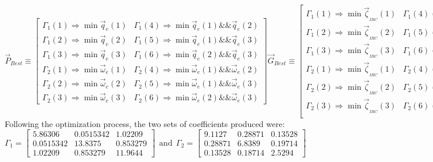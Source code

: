 \begin{subequations}
\begin{equation}
\vec{P}_{Best}\equiv
\begin{bmatrix}
\Gamma_1(1)\Rightarrow \min \vec{q}_e(1) & \Gamma_1(4)\Rightarrow \min \vec{q}_e(1)\&\&\vec{q}_e(2)\\
\Gamma_1(2)\Rightarrow \min \vec{q}_e(2)& \Gamma_1(5)\Rightarrow \min\vec{q}_e(1)\&\&\vec{q}_e(3) \\
\Gamma_1(3)\Rightarrow \min \vec{q}_e(3) & \Gamma_1(6)\Rightarrow \min\vec{q}_e(2)\&\&\vec{q}_e(3)\\
\Gamma_2(1)\Rightarrow \min \vec{\omega}_e(1) & \Gamma_2(4)\Rightarrow \min\vec{\omega}_e(1)\&\&\vec{\omega}_e(2)\\
\Gamma_2(2)\Rightarrow \min \vec{\omega}_e(2) & \Gamma_2(5)\Rightarrow\min\vec{\omega}_e(1)\&\&\vec{\omega}_e(3)\\
\Gamma_2(3)\Rightarrow \min \vec{\omega}_e(3)& \Gamma_2(6)\Rightarrow\min\vec{\omega}_e(2)\&\&\vec{\omega}_e(3)
\end{bmatrix}
\end{equation}
\begin{equation}
\vec{G}_{Best}\equiv\begin{bmatrix}
\Gamma_1(1)\Rightarrow \min \vec{\zeta}_{_{IBC}}(1) & \Gamma_1(4)\Rightarrow\min\vec{\zeta}_{_{IBC}}(1)\&\& \vec{\zeta}_{_{IBC}}(2)\\
\Gamma_1(2)\Rightarrow \min \vec{\zeta}_{_{IBC}}(2) & \Gamma_1(5)\Rightarrow\min\vec{\zeta}_{_{IBC}}(1)\&\& \vec{\zeta}_{_{IBC}}(3)\\
\Gamma_1(3)\Rightarrow \min \vec{\zeta}_{_{IBC}}(3) & \Gamma_1(6)\Rightarrow\min\vec{\zeta}_{_{IBC}}(2)\&\& \vec{\zeta}_{_{IBC}}(3)\\
\Gamma_2(1)\Rightarrow \min \vec{\zeta}_{_{IBC}}(1) & \Gamma_2(4)\Rightarrow\min\vec{\zeta}_{_{IBC}}(1)\&\& \vec{\zeta}_{_{IBC}}(2)\\
\Gamma_2(2)\Rightarrow \min \vec{\zeta}_{_{IBC}}(2) & \Gamma_2(5)\Rightarrow\min\vec{\zeta}_{_{IBC}}(1)\&\& \vec{\zeta}_{_{IBC}}(3)\\
\Gamma_2(3)\Rightarrow \min \vec{\zeta}_{_{IBC}}(3) & \Gamma_2(6)\Rightarrow\min\vec{\zeta}_{_{IBC}}(2)\&\& \vec{\zeta}_{_{IBC}}(3)\\
\end{bmatrix}
\end{equation}
\end{subequations}
Following the optimization process, the two sets of coefficients produced were:
\begin{equation}\label{eq:optimized-IBC}
\Gamma_1 = \begin{bmatrix}
5.86306 & 0.0515342 & 1.02209\\
0.0515342 & 13.8375 & 0.853279\\
1.02209 & 0.853279 & 11.9644
\end{bmatrix}
~~\text{and}~~
\Gamma_2 = \begin{bmatrix}
9.1127 & 0.28871 & 0.13528\\
0.28871 & 6.8389 & 0.19714\\
0.13528 & 0.18714 & 2.5294
\end{bmatrix}
\end{equation}
